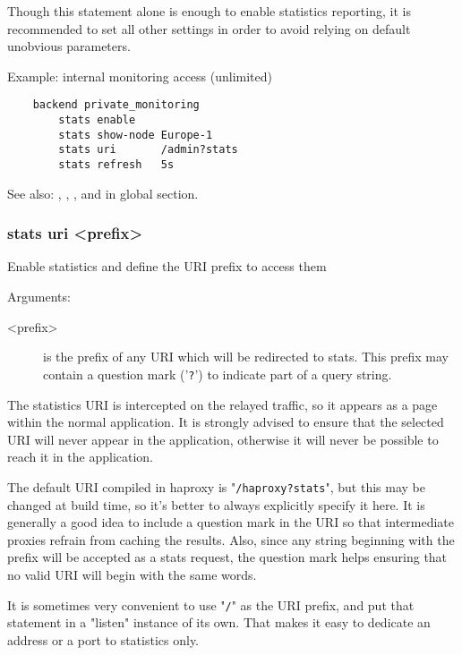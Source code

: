   Though this statement alone is enough to enable statistics reporting, it is
  recommended to set all other settings in order to avoid relying on default
  unobvious parameters.

  Example: internal monitoring access (unlimited)
  \begin{verbatim}
    backend private_monitoring
        stats enable
        stats show-node Europe-1
        stats uri       /admin?stats
        stats refresh   5s
  \end{verbatim}

  See also: , , , and  in global
            section.

\subsubsection[stats uri]{stats uri <prefix>}


  Enable statistics and define the URI prefix to access them


  Arguments:
  \begin{description}
  \item[<prefix>] is the prefix of any URI which will be redirected to stats. This
              prefix may contain a question mark ('\verb|?|') to indicate part of a
              query string.
  \end{description}

  The statistics URI is intercepted on the relayed traffic, so it appears as a
  page within the normal application. It is strongly advised to ensure that the
  selected URI will never appear in the application, otherwise it will never be
  possible to reach it in the application.

  The default URI compiled in haproxy is "\verb|/haproxy?stats|", but this may be
  changed at build time, so it's better to always explicitly specify it here.
  It is generally a good idea to include a question mark in the URI so that
  intermediate proxies refrain from caching the results. Also, since any string
  beginning with the prefix will be accepted as a stats request, the question
  mark helps ensuring that no valid URI will begin with the same words.

  It is sometimes very convenient to use "\verb|/|" as the URI prefix, and put that
  statement in a "listen" instance of its own. That makes it easy to dedicate
  an address or a port to statistics only.

